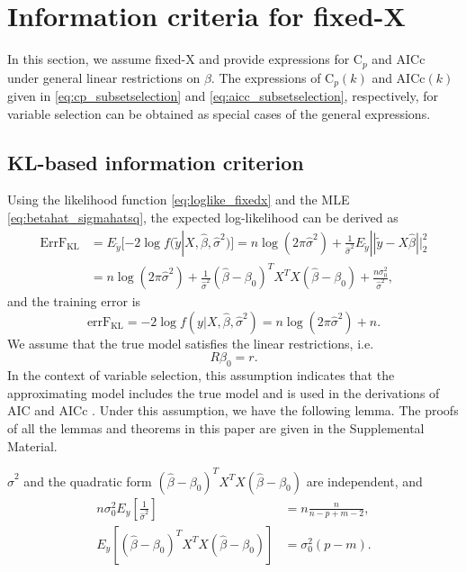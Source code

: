 \section{ Information criteria for fixed-X }
\label{sec:ic_fixedx}
In this section, we assume fixed-X and provide expressions for C$_p$ and AICc under general linear restrictions on $\beta$. The expressions of C$_p(k)$ and AICc$(k)$ given in \eqref{eq:cp_subsetselection} and \eqref{eq:aicc_subsetselection}, respectively, for variable selection can be obtained as special cases of the general expressions.
\subsection{KL-based information criterion}
Using the likelihood function \eqref{eq:loglike_fixedx} and the MLE \eqref{eq:betahat_sigmahatsq}, the expected log-likelihood can be derived as 
\begin{equation*}
\begin{aligned}
\text{ErrF}_\text{KL} &=  E_{\tilde{y}} [-2 \log f( \tilde{y} | X,\hat\beta,\hat\sigma^2 )] =  n \log (2\pi \hat\sigma^2) + \frac{1}{\hat\sigma^2} E_{\tilde{y}} || \tilde{y}-X\hat\beta||_2^2 \\
&= n \log (2\pi \hat\sigma^2) + \frac{1}{\hat\sigma^2}  (\hat\beta-\beta_0)^T X^T X (\hat\beta-\beta_0) + \frac{n\sigma_0^2}{\hat\sigma^2},
\end{aligned}
\end{equation*}
and the training error is 
\begin{equation*}
\text{errF}_\text{KL} = -2\log f(y|X,\hat\beta,\hat\sigma^2) = n\log(2\pi\hat\sigma^2) + n.
\end{equation*}
We assume that the true model satisfies the linear restrictions, i.e.
\begin{equation*}
R\beta_0 = r.
\end{equation*}
In the context of variable selection, this assumption indicates that the approximating model includes the true model and is used in the derivations of AIC \citep{linhart1986model} and AICc \citep{hurvich1989regression}. Under this assumption, we have the following lemma. The proofs of all the lemmas and theorems in this paper are given in the Supplemental Material.   
\begin{lemma}
  $\hat\sigma^2$ and the quadratic form $(\hat \beta-\beta_0)^T X^T X (\hat \beta-\beta_0)$ are independent, and 
  \begin{equation*}
  \begin{aligned}
    n \sigma_0^2 E_y\left[ \frac{1}{\hat{\sigma}^2} \right] &= n\frac{n}{n-p+m-2},\\
    E_y  \left [ (\hat \beta-\beta_0)^T X^T X (\hat \beta-\beta_0) \right ] &= \sigma_0^2 (p-m).
  \end{aligned}
  \end{equation*}
\label{thm:components_ekl_lr_fixedx}
\end{lemma}
